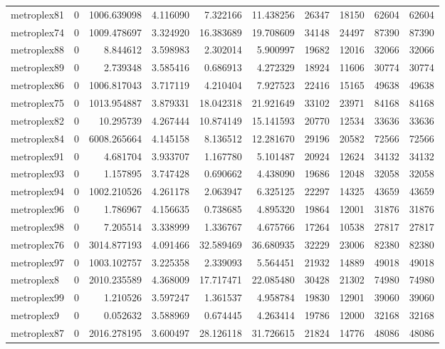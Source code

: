 \begin{longtable}{|l|r|r|r|r|r|r|r|r|r|}
metroplex81 & 0 & 1006.639098 & 4.116090 & 7.322166 & 11.438256 & 26347 & 18150 & 62604 & 62604 \\
metroplex74 & 0 & 1009.478697 & 3.324920 & 16.383689 & 19.708609 & 34148 & 24497 & 87390 & 87390 \\
metroplex88 & 0 & 8.844612 & 3.598983 & 2.302014 & 5.900997 & 19682 & 12016 & 32066 & 32066 \\
metroplex89 & 0 & 2.739348 & 3.585416 & 0.686913 & 4.272329 & 18924 & 11606 & 30774 & 30774 \\
metroplex86 & 0 & 1006.817043 & 3.717119 & 4.210404 & 7.927523 & 22416 & 15165 & 49638 & 49638 \\
metroplex75 & 0 & 1013.954887 & 3.879331 & 18.042318 & 21.921649 & 33102 & 23971 & 84168 & 84168 \\
metroplex82 & 0 & 10.295739 & 4.267444 & 10.874149 & 15.141593 & 20770 & 12534 & 33636 & 33636 \\
metroplex84 & 0 & 6008.265664 & 4.145158 & 8.136512 & 12.281670 & 29196 & 20582 & 72566 & 72566 \\
metroplex91 & 0 & 4.681704 & 3.933707 & 1.167780 & 5.101487 & 20924 & 12624 & 34132 & 34132 \\
metroplex93 & 0 & 1.157895 & 3.747428 & 0.690662 & 4.438090 & 19686 & 12048 & 32058 & 32058 \\
metroplex94 & 0 & 1002.210526 & 4.261178 & 2.063947 & 6.325125 & 22297 & 14325 & 43659 & 43659 \\
metroplex96 & 0 & 1.786967 & 4.156635 & 0.738685 & 4.895320 & 19864 & 12001 & 31876 & 31876 \\
metroplex98 & 0 & 7.205514 & 3.338999 & 1.336767 & 4.675766 & 17264 & 10538 & 27817 & 27817 \\
metroplex76 & 0 & 3014.877193 & 4.091466 & 32.589469 & 36.680935 & 32229 & 23006 & 82380 & 82380 \\
metroplex97 & 0 & 1003.102757 & 3.225358 & 2.339093 & 5.564451 & 21932 & 14889 & 49018 & 49018 \\
metroplex8 & 0 & 2010.235589 & 4.368009 & 17.717471 & 22.085480 & 30428 & 21302 & 74980 & 74980 \\
metroplex99 & 0 & 1.210526 & 3.597247 & 1.361537 & 4.958784 & 19830 & 12901 & 39060 & 39060 \\
metroplex9 & 0 & 0.052632 & 3.588969 & 0.674445 & 4.263414 & 19786 & 12000 & 32168 & 32168 \\
metroplex87 & 0 & 2016.278195 & 3.600497 & 28.126118 & 31.726615 & 21824 & 14776 & 48086 & 48086 \\

\end{longtable}
